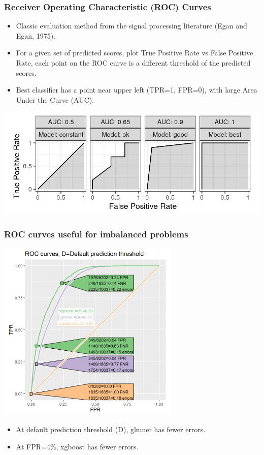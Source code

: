 \documentclass[t]{beamer}
\begin{document}
\begin{frame}
  \frametitle{Receiver Operating Characteristic (ROC) Curves}
  \begin{itemize}
  \item Classic evaluation method from the signal processing
    literature (Egan and Egan, 1975).
  \item For a given set of predicted scores, plot True Positive Rate
    vs False Positive Rate, each point on the ROC curve is a different
    threshold of the predicted scores.
  \item Best classifier has a point near upper left (TPR=1, FPR=0), with large
    Area Under the Curve (AUC).
  \end{itemize}
  \includegraphics[width=\textwidth]{figure-more-than-one-binary}
\end{frame}

\begin{frame}
  \frametitle{ROC curves useful for imbalanced problems}

  \includegraphics[width=0.65\textwidth]{figure-batchtools-expired-earth-roc}

  \begin{itemize}
  \item At default prediction threshold (D), glmnet has fewer errors.
  \item At FPR=4\%, xgboost has fewer errors.
  \end{itemize}
  
\end{frame}
 
\end{document}
